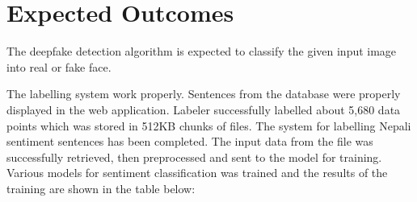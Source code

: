 	\chapter{Expected Outcomes}
        The deepfake detection algorithm is expected to classify the given input image into real or fake face.  

    	The labelling system work properly. Sentences from the database were properly displayed in the web application. Labeler successfully labelled about 5,680 data points which was stored in 512KB chunks of files. The system for labelling Nepali sentiment sentences has been completed. The input data from the file was successfully retrieved, then preprocessed and sent to the model for training.
    	\vspace{0.2in}
    	Various models for sentiment classification was trained and the results of the training are shown in the table below:
    	


